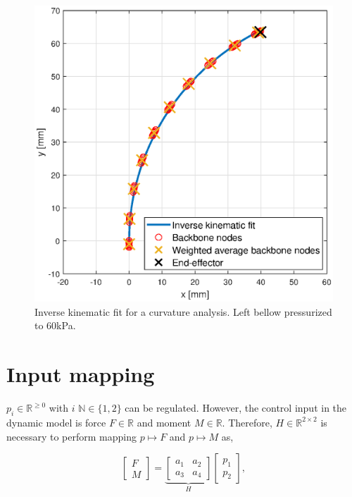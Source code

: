\begin{figure}[H]
\begin{minipage}{0.5\textwidth}
        \includegraphics[width=\textwidth]{Figures/Chapter3/nodalfit.eps} 
        \caption{Inverse kinematic fit for a curvature analysis. Left bellow pressurized to 60kPa.}
        \label{fig3:nodalfitcurv}
    \end{minipage}
\end{figure}







\section{Input mapping}
\label{sec3:InputMapping}

 $p_i \in \mathbb{R}^{\geq 0}$ with $i$ $\mathbb{N} \in \{1,2\}$ can be regulated. However, the control input in the dynamic model is force $F \in \mathbb{R}$ and moment $M \in \mathbb{R}$. Therefore, $H \in \mathbb{R}^{2 \times 2}$ is necessary to perform mapping $p \mapsto F$ and $p \mapsto M$ as,

\begin{equation}
     \begin{bmatrix} F \\ M \end{bmatrix}     = \underbrace{\begin{bmatrix}  a_1 & a_2 \\ a_3 & a_4 \end{bmatrix}}_{H}         \begin{bmatrix}  p_1 \\ p_2 \end{bmatrix}, \label{eq3:H}
\end{equation}

